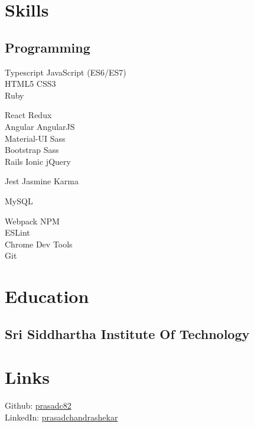 \documentclass[]{my-resume-openfont}
\begin{document}
\begin{minipage}[t]{0.33\textwidth} 


\section{Skills}
\subsection{Programming}
Typescript \textbullet{} JavaScript (ES6/ES7) \\
HTML5 \textbullet{} CSS3 \\
Ruby
\sectionsep

React \textbullet{} Redux \\
Angular \textbullet{} AngularJS \\
Material-UI \textbullet{} Sass \\
Bootstrap \textbullet{} Sass \\
Rails \textbullet{} Ionic \textbullet{} jQuery
\sectionsep

Jest \textbullet{} Jasmine \textbullet{} Karma
\sectionsep

MySQL 
\sectionsep

Webpack \textbullet{} NPM \\
ESLint  \\
Chrome Dev Tools  \\
Git
\sectionsep



\section{Education}

\subsection{Sri Siddhartha Institute Of Technology}
\sectionsep


\section{Links}
Github: \href{https://github.com/prasadc82}{prasadc82} \\
LinkedIn: \href{https://www.linkedin.com/in/prasadchandrashekar}{prasadchandrashekar} \\
\sectionsep

%
%

\end{minipage}
\end{document}
